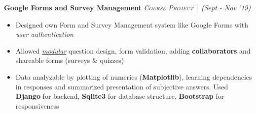 \documentclass{article}
\begin{document}
\vspace{-5pt}
\textbf{Google Forms and Survey Management} \hfill{\sl \small \textsc{Course Project} $\bigm|$ (Sept - Nov '19)}
\vspace{-7pt}
\begin{itemize}[itemsep = -1.5 mm, leftmargin=*]
    \item Designed own Form and Survey Management system like Google Forms with \textit{user authentication}
    \item Allowed \textit{\underline{modular}} question design, form validation, adding \textbf{collaborators} and shareable forms (surveys \& quizzes)
    \item Data analyzable by plotting of numerics (\textbf{Matplotlib}), learning dependencies in responses and summarized presentation of subjective answers. Used \textbf{Django} for backend, \textbf{Sqlite3} for database structure, \textbf{Bootstrap} for responsiveness
\end{itemize}

\end{document}

